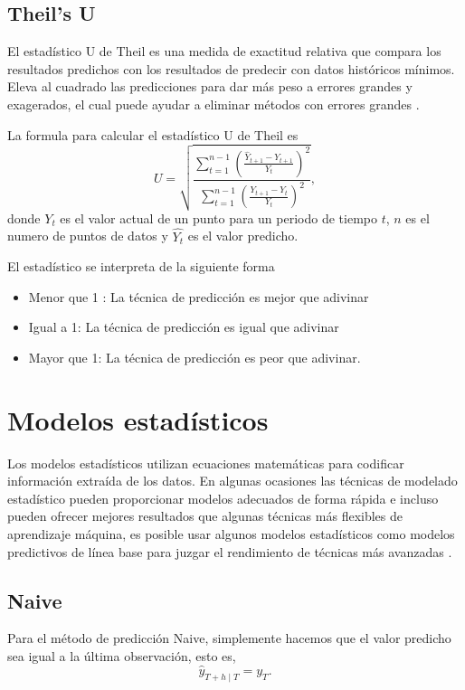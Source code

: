 \subsection{Theil's U}

El estadístico U de Theil es una medida de exactitud relativa que compara los resultados predichos con los resultados de predecir con datos históricos mínimos. Eleva al cuadrado las predicciones para dar más peso a errores grandes y exagerados, el cual puede ayudar a eliminar métodos con errores grandes \parencite{OracleCrystalBall}.

La formula para calcular el estadístico U de Theil es
\[
U=\sqrt{\frac{\sum_{t=1}^{n-1}\left(\frac{\hat{Y}_{t+1}-Y_{t+1}}{Y_{t}}\right)^{2}}{\sum_{t=1}^{n-1}\left(\frac{Y_{t+1}-Y_{t}}{Y_{t}}\right)^{2}}},
\]
donde $Y_t$ es el valor actual de un punto para un periodo de tiempo $t$, $n$ es el numero de puntos de datos y $\hat{Y_t}$ es el valor predicho.

El estadístico se interpreta de la siguiente forma

\begin{itemize}
	\item Menor que 1 : La técnica de predicción es mejor que adivinar
	\item  Igual a 1: La técnica de predicción es igual que adivinar
	\item Mayor que 1: La técnica de predicción es peor que adivinar.
\end{itemize}

\section{Modelos estadísticos}
\label{modelosestadisticos}
Los modelos estadísticos utilizan ecuaciones matemáticas para codificar información extraída de los datos. En algunas ocasiones las técnicas de modelado estadístico pueden proporcionar modelos adecuados de forma rápida e incluso pueden ofrecer mejores resultados que algunas técnicas más flexibles de aprendizaje máquina, es posible usar algunos modelos estadísticos como modelos predictivos de línea base para juzgar el rendimiento de técnicas más avanzadas \parencite{IBMDocs2021}. 

\subsection{Naive}

Para el método de predicción Naive, simplemente hacemos que el valor predicho sea igual a la última observación, esto es,
\[ \hat{y}_{T+h \mid T}=y_{T}. \]

